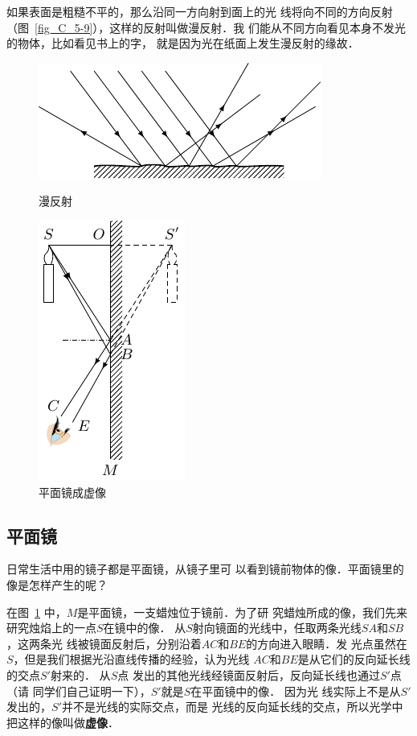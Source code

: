 如果表面是粗糙不平的，那么沿同一方向射到面上的光
线将向不同的方向反射（图~\ref{fig_C_5-9}），这样的反射叫做漫反射．我
们能从不同方向看见本身不发光的物体，比如看见书上的字，
就是因为光在纸面上发生漫反射的缘故．
\begin{figure}[htbp]
    \centering
    \begin{minipage}[t]{0.48\textwidth}
        \centering
        \includegraphics{fig/C/5-9.pdf}
        \caption{漫反射}\label{fig_C_5-9}
    \end{minipage}
    \begin{minipage}[t]{0.48\textwidth}
        \centering
        \includegraphics{fig/C/5-10.pdf}
        \caption{平面镜成虚像}\label{fig_C_5-10}
    \end{minipage}
\end{figure}

\subsection{平面镜}

日常生活中用的镜子都是平面镜，从镜子里可
以看到镜前物体的像．平面镜里的像是怎样产生的呢？

在图~\ref{fig_C_5-10} 中，$M$是平面镜，一支蜡烛位于镜前．为了研
究蜡烛所成的像，我们先来研究烛焰上的一点$S$在镜中的像．
从$S$射向镜面的光线中，任取两条光线$SA$和$SB$，这两条光
线被镜面反射后，分别沿着$AC$和$BE$的方向进入眼睛．发
光点虽然在$S$，但是我们根据光沿直线传播的经验，认为光线
$AC$和$BE$是从它们的反向延长线的交点$S'$射来的．
从$S$点
发出的其他光线经镜面反射后，反向延长线也通过$S'$点（请
同学们自己证明一下），$S'$就是$S$在平面镜中的像．
因为光
线实际上不是从$S'$发出的，$S'$并不是光线的实际交点，而是
光线的反向延长线的交点，所以光学中把这样的像叫做\textbf{虚像}．

